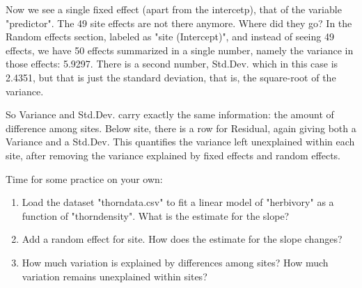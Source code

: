 \documentclass[12pt,a4paper]{scrartcl}\usepackage[]{graphicx}\usepackage[]{color}
\begin{document}
Now we see a single fixed effect (apart from the intercetp), that of the variable "predictor". The 49 site effects are not there anymore. Where did they go? In the Random effects section, labeled as "site (Intercept)", and instead of seeing 49 effects, we have 50 effects summarized in a single number, namely the variance in those effects: 5.9297. There is a second number, Std.Dev. which in this case is  2.4351, but that is just the standard deviation, that is, the square-root of the variance.

So Variance and Std.Dev. carry exactly the same information: the amount of difference among sites.
Below site, there is a row for Residual, again giving both a Variance and a Std.Dev. This quantifies the variance left unexplained within each site, after removing the variance explained by fixed effects and random effects.


Time for some practice on your own:

\begin{Exercise}[difficulty=1, title={A mixed model for the thorn data set}]
\begin{enumerate}
  \item Load the dataset "thorndata.csv" to fit a linear model of "herbivory" as a function of "thorndensity". What is the estimate for the slope?\\
  \item Add a random effect for site. How does the estimate for the slope changes?\\
  \item How much variation is explained by differences among sites? How much variation remains unexplained within sites?
\end{enumerate}
\end{Exercise}
\end{document}
